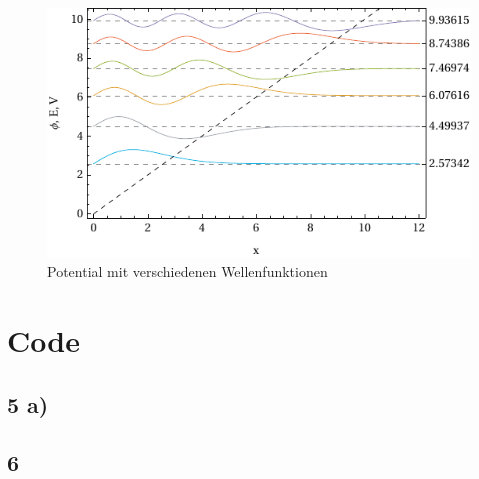 \begin{figure}[h!]
	\centering
	\includegraphics[scale = 1.388888888]{img/out.pdf}
	\caption{Potential mit verschiedenen Wellenfunktionen}
	\label{fig:out}
\end{figure}



\clearpage
\section{Code}

\subsection*{5 a)}

\clearpage

\subsection*{6}


\clearpage



